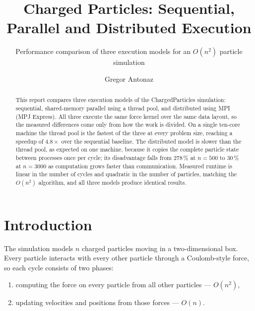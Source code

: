 \documentclass[sigconf]{acmart}
\begin{document}
\title{Charged Particles: Sequential, Parallel and Distributed Execution}
\subtitle{Performance comparison of three execution models for an $O(n^2)$ particle simulation}

\author{Gregor Antonaz}

\renewcommand{\shortauthors}{Antonaz}

\begin{abstract}
This report compares three execution models of the ChargedParticles simulation: sequential,
shared-memory parallel using a thread pool, and distributed using MPI (MPJ Express). All three
execute the same force kernel over the same data layout, so the measured differences come only from
how the work is divided. On a single ten-core machine the thread pool is the fastest of the three at
every problem size, reaching a speedup of $4.8\times$ over the sequential baseline. The distributed
model is slower than the thread pool, as expected on one machine, because it copies the complete
particle state between processes once per cycle; its disadvantage falls from $278\,\%$ at $n = 500$
to $30\,\%$ at $n = 3000$ as computation grows faster than communication. Measured runtime is linear
in the number of cycles and quadratic in the number of particles, matching the $O(n^2)$ algorithm,
and all three models produce identical results.
\end{abstract}


\maketitle

\section{Introduction}

The simulation models $n$ charged particles moving in a two-dimensional box. Every particle
interacts with every other particle through a Coulomb-style force, so each cycle consists of two
phases:

\begin{enumerate}
    \item computing the force on every particle from all other particles --- $O(n^2)$,
    \item updating velocities and positions from those forces --- $O(n)$.
\end{enumerate}
\end{document}
